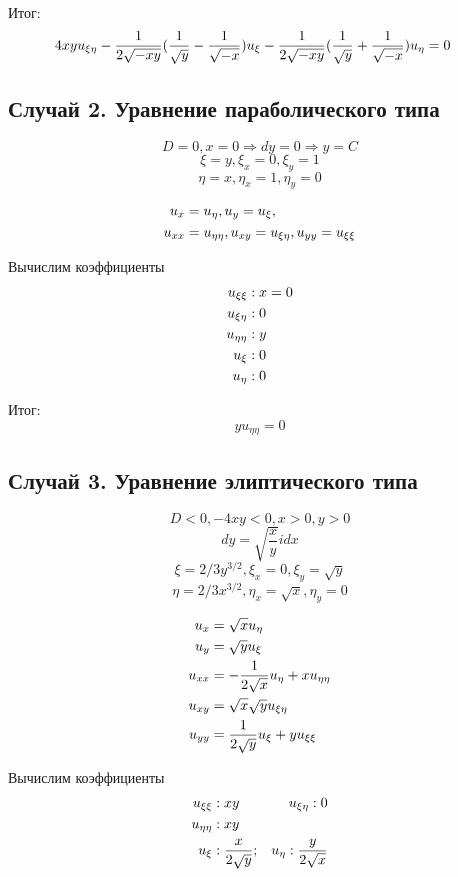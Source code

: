 \documentclass[a4paper,12pt]{article}
\begin{document}
Итог:
\begin{align}
4xyu_{\xi\eta} \notag
- \frac{1}{2\sqrt{-xy}}(\frac{1}{\sqrt{y}} - \frac{1}{\sqrt{-x}})u_\xi \notag 
&- \frac{1}{2\sqrt{-xy}}(\frac{1}{\sqrt{y}} + \frac{1}{\sqrt{-x}})u_\eta = 0 \notag
\end{align}

\subsection{Случай 2. Уравнение параболического типа}
$$D = 0, x = 0 \Rightarrow dy = 0 \Rightarrow y = C$$
$$\xi = y, \xi_x = 0, \xi_y = 1$$
$$\eta = x, \eta_x = 1, \eta_y = 0$$

\begin{align}
u_x &= u_\eta, \notag
u_y = u_\xi, \notag \\
u_{xx} &= u_{\eta\eta}, \notag
u_{xy} = u_{\xi\eta}, \notag
u_{yy} = u_{\xi\xi} \notag
\end{align}

Вычислим коэффициенты
\begin{align}
u_{\xi\xi} &: x = 0 \notag \\
u_{\xi\eta} &: 0 \notag \\
u_{\eta\eta} &: y \notag \\
u_{\xi} &: 0 \notag \\
u_\eta &: 0 \notag
\end{align}

Итог:
$$yu_{\eta\eta} = 0$$

\subsection{Случай 3. Уравнение элиптического типа}
$$D < 0, -4xy < 0, x>0, y>0$$
$$dy = \sqrt{\frac{x}{y}}idx$$
$$\xi = 2/3y^{3/2}, \xi_x = 0, \xi_y = \sqrt{y}$$
$$\eta = 2/3x^{3/2}, \eta_x = \sqrt{x}, \eta_y = 0$$

\begin{align}
u_x &= \sqrt{x}u_\eta \notag \\
u_y &= \sqrt{y}u_\xi \notag \\
u_{xx} &= -\frac{1}{2\sqrt{x}}u_\eta + xu_{\eta\eta} \notag \\
u_{xy} &= \sqrt{x}\sqrt{y}u_{\xi\eta} \notag \\
u_{yy} &= \frac{1}{2\sqrt{y}}u_\xi + yu_{\xi\xi} \notag
\end{align}

Вычислим коэффициенты
\begin{align}
u_{\xi\xi} &: xy \notag     &u_{\xi\eta} : 0 \notag \\
u_{\eta\eta} &: xy \notag \\
u_\xi &: \frac{x}{2\sqrt{y}}; &u_\eta : \frac{y}{2\sqrt{x}} \notag 
\end{align}
\end{document}
